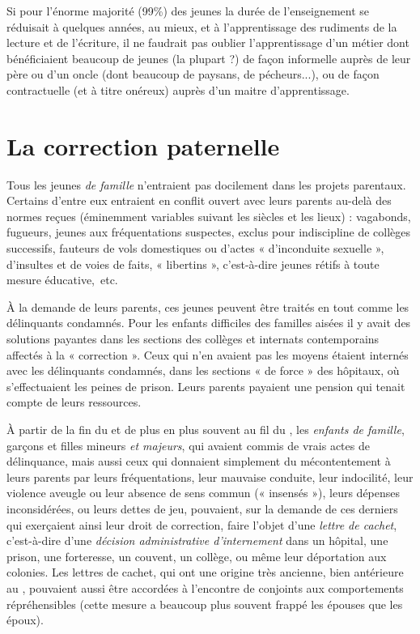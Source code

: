 Si pour l'énorme majorité (99\%) des jeunes la durée de l'enseignement se réduisait à quelques années, au mieux, et à l'apprentissage des rudiments de la lecture et de l'écriture, il ne faudrait pas oublier l'apprentissage d'un métier dont bénéficiaient beaucoup de jeunes (la plupart ?) de façon informelle auprès de leur père ou d'un oncle (dont beaucoup de paysans, de pécheurs...), ou de façon contractuelle (et à titre onéreux) auprès d'un maitre d'apprentissage. 

\section{La correction paternelle}

 Tous les jeunes \emph{de famille} n'entraient pas docilement dans les projets parentaux. Certains d'entre eux entraient en conflit ouvert avec leurs parents au-delà des normes reçues (éminemment variables suivant les siècles et les lieux) : vagabonds, fugueurs, jeunes aux fréquentations suspectes, exclus pour indiscipline de collèges successifs, fauteurs de vols domestiques ou d'actes « d'inconduite sexuelle », d'insultes et de voies de faits, « libertins », c'est-à-dire jeunes rétifs à toute mesure éducative,~etc. 

 À la demande de leurs parents, ces jeunes peuvent être traités en tout comme les délinquants con\-dam\-nés. Pour les enfants difficiles des familles aisées il y avait des solutions payantes dans les sections des collèges et internats contemporains affectés à la « correction ». Ceux qui n'en avaient pas les moyens étaient internés avec les délinquants condamnés, dans les sections « de force » des hôpitaux, où s'effectuaient les peines de prison. Leurs parents payaient une pension qui tenait compte de leurs ressources. 

 À partir de la fin du  et de plus en plus souvent au fil du , les \emph{enfants de famille}, garçons et filles mineurs \emph{et majeurs}, qui avaient commis de vrais actes de délinquance, mais aussi ceux qui donnaient simplement du mécontentement à leurs parents par leurs fréquentations, leur mauvaise conduite, leur indocilité, leur violence aveugle ou leur absence de sens commun (« insensés »), leurs dépenses inconsidérées, ou leurs dettes de jeu, pouvaient, sur la demande de ces derniers qui exerçaient ainsi leur droit de correction, faire l'objet d'une \emph{lettre de cachet}, c'est-à-dire d'une \emph{décision administrative d'internement} dans un hôpital, une prison, une forteresse, un couvent, un collège, ou même leur déportation aux colonies. Les lettres de cachet, qui ont une origine très ancienne, bien antérieure au , pouvaient aussi être accordées à l'encontre de conjoints aux comportements répréhensibles (cette mesure a beaucoup plus souvent frappé les épouses que les époux). 

